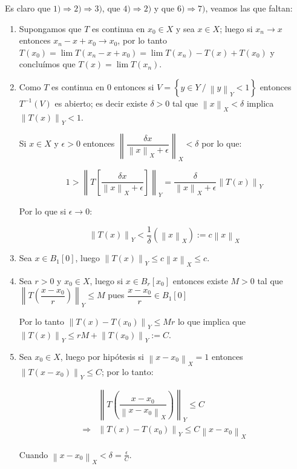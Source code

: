 \documentclass[11pt]{article}
\newcommand{\norm}[1]{\left\lVert#1\right\rVert}
\newcommand{\sett}[1]{\left\lbrace#1\right\rbrace}
\numberwithin{theorem}{subsection}
\newenvironment{proof}[1][Demostraci\'on]{\begin{trivlist}
		\item[\hskip \labelsep {\bfseries #1}]}{\end{trivlist}}
\newcommand{\qed}{\nobreak \ifvmode \relax \else
	\ifdim\lastskip<1.5em \hskip-\lastskip
	\hskip1.5em plus0em minus0.5em \fi \nobreak
	\vrule height0.75em width0.5em depth0.25em\fi}
\begin{document}
\begin{proof}
	Es claro que $1) \Longrightarrow 2) \Longrightarrow 3)$, que $4) \Longrightarrow 2)$ y que $6) \Longrightarrow 7)$, veamos las que faltan:
	
	\begin{enumerate}
		\item[$3) \Longrightarrow 1)$] Supongamos que $T$ es continua en $x_0 \in X$ y sea $x \in X$; luego si $x_n \rightarrow x$ entonces $x_n - x + x_0 \rightarrow x_0$, por lo tanto $T(x_0) = \lim T(x_n - x + x_0) = \lim T(x_n) - T(x) + T(x_0)$ y conclu\'imos que $T(x) = \lim T(x_n)$.
		
		\item[$ 2) \Longrightarrow 4) $] Como $T$ es continua en $0$ entonces si $V = \sett{y \in Y \ / \ \norm{y}_Y < 1}$ entonces $T^{-1}(V)$ es abierto; es decir existe $\delta > 0$ tal que $\norm{x}_X < \delta$ implica $\norm{T(x)}_Y < 1$.
		
		Si $x \in X$ y $\epsilon > 0$ entonces $\norm{\dfrac{\delta x}{\norm{x}_X + \epsilon}}_X < \delta$ por lo que:
		
		\[
		1 > \norm{T\left[\dfrac{\delta x}{\norm{x}_X + \epsilon}\right]}_Y = \dfrac{\delta}{\norm{x}_X + \epsilon} \norm{T(x)}_Y
		\]
		
		Por lo que si $\epsilon \rightarrow 0$:
		
		\[
		\norm{T(x)}_Y < \dfrac{1}{\delta} \left(\norm{x}_X\right) := c \norm{x}_X
		\]
		
		\item[$ 4) \Longrightarrow 5) $] Sea $x \in B_1[0]$, luego $\norm{T(x)}_Y \leq c \norm{x}_X \leq c$.
		
		\item[$ 5) \Longrightarrow 6) $] Sea $r > 0$ y $x_0 \in X$, luego si $x \in B_r[x_0]$ entonces existe $M > 0$ tal que $\norm{T\left(\dfrac{x- x_0}{r}\right)}_Y \leq M$ pues $\dfrac{x- x_0}{r} \in B_1[0]$
		
		Por lo tanto $\norm{T(x) - T(x_0)}_Y \leq Mr$ lo que implica que $\norm{T(x)}_Y \leq rM + \norm{T(x_0)}_Y := C$.
		
		\item[$ 7) \Longrightarrow 1) $] Sea $x_0 \in X$, luego por hip\'otesis si $\norm{x - x_0}_X = 1$ entonces $\norm{T(x - x_0)}_Y \leq C$; por lo tanto:
		
		\begin{equation*}
		\begin{array}{cc}
			& \norm{T \left(\dfrac{x- x_0}{\norm{x - x_0}_X}\right)}_Y \leq C \\
			\Longrightarrow & \norm{T(x) - T(x_0)}_Y \leq C\norm{x- x_0}_X
		\end{array}
		\end{equation*}
		
		Cuando $\norm{x - x_0}_X < \delta = \frac{\epsilon}{C}$.
		\qed
	\end{enumerate}
\end{proof}
\end{document}
